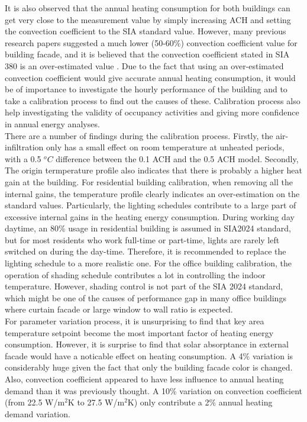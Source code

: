 \documentclass[a4paper, oneside]{discothesis}
\begin{document}
	It is also observed that the annual heating consumption for both buildings can get very close to the measurement value by simply increasing ACH and setting the convection coefficient to the SIA standard value. However, many previous research papers suggested a much lower (50-60\%) convection coefficient value for building facade, and it is believed that the convection coefficient stated in SIA 380 is an over-estimated value \cite{crawley2000energy,DIAZ2017393}. Due to the fact that using an over-estimated convection coefficient would give accurate annual heating consumption, it would be of importance to investigate the hourly performance of the building and to take a calibration process to find out the causes of these. Calibration process also help investigating the validity of occupancy activities and giving more confidence in annual energy analyses.\\

 	There are a number of findings during the calibration process. Firstly, the air-infiltration only has a small effect on room temperature at unheated periods, with a 0.5 $^oC$ difference between the 0.1 ACH and the 0.5 ACH model. Secondly, The origin termperature profile also indicates that there is probably a higher heat gain at the building. For residential building calibration, when removing all the internal gains, the temperature profile clearly indicates an over-estimation on the standard values. Particularly, the lighting schedules contribute to a large part of excessive internal gains in the heating energy consumption. During working day daytime, an 80\% usage in residential building is assumed in SIA2024 standard, but for most residents who work full-time or part-time, lights are rarely left switched on during the day-time. Therefore, it is recommended to replace the lighting schedule to a more realistic one. For the office building calibration, the operation of shading schedule contributes a lot in controlling the indoor temperature. However, shading control is not part of the SIA 2024 standard, which might be one of the causes of performance gap in many office buildings where curtain facade or large window to wall ratio is expected.\\

 	For parameter variation process, it is unsurprising to find that key area temperature setpoint become the most important factor of heating energy consumption. However, it is surprise to find that solar absorptance in external facade would have a noticable effect on heating consumption. A 4\% variation is considerably huge given the fact that only the building facade color is changed. Also, convection coefficient appeared to have less influence to annual heating demand than it was previously thought. A 10\% variation on convection coefficient (from 22.5 W/m$^2$K to 27.5 W/m$^2$K) only contribute a 2\% annual heating demand variation.\\
\end{document}
